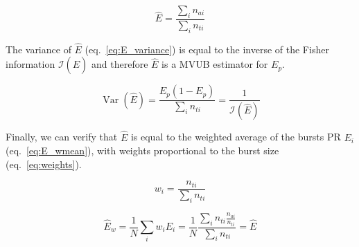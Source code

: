 \begin{equation}
\label{eq:E_estim}
\hat{E} = \frac{\sum_i n_{ai}}{\sum_i n_{ti}}
\end{equation}

The variance of $\hat{E}$ (eq.~\ref{eq:E_variance}) is equal to the inverse of 
the Fisher information $\mathcal{I}(\hat{E})$ and therefore $\hat{E}$ is a MVUB 
estimator for $E_p$.

\begin{equation}
\label{eq:E_variance}
\operatorname{Var}(\hat{E}) = \frac{E_p (1 - E_p)}{\sum_i n_{ti}} = \frac{1}{\mathcal{I}(\hat{E})}
\end{equation}

Finally, we can verify that $\hat{E}$ is equal to the weighted average of the bursts
PR $E_i$ (eq.~\ref{eq:E_wmean}), with weights proportional to the burst size (eq.~\ref{eq:weights}).

\begin{equation}
\label{eq:weights}
w_i
= \frac{n_{ti}}{\sum_i n_{ti}}
\end{equation}

\begin{equation}
\label{eq:E_wmean}
\hat{E}_w = \frac{1}{N} \sum_i w_i E_i 
= \frac{1}{N} \frac{\sum_i n_{ti} \frac{n_{ai}}{n_{ti}} }{\sum_i n_{ti}} = \hat{E}
\end{equation}



